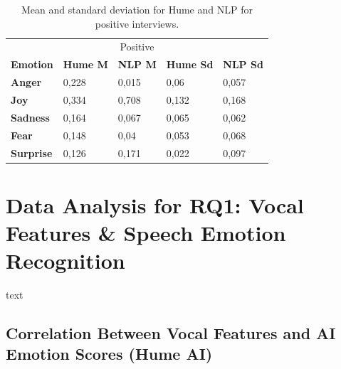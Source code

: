\begin{table}[H]
    \begin{tabular}{lllll}
    \multicolumn{5}{c}{\cellcolor[HTML]{BFBFBF}Positive}                                                                                                                                           \\
    \multicolumn{1}{l|}{\textbf{Emotion}}  & \multicolumn{1}{c}{\textbf{Hume M}} & \multicolumn{1}{c}{\textbf{NLP M}} & \multicolumn{1}{c}{\textbf{Hume Sd}} & \multicolumn{1}{c}{\textbf{NLP Sd}} \\ \hline
    \multicolumn{1}{l|}{\textbf{Anger}}    & 0,228                               & 0,015                              & 0,06                                 & 0,057                               \\
    \multicolumn{1}{l|}{\textbf{Joy}}      & 0,334                               & 0,708                              & 0,132                                & 0,168                               \\
    \multicolumn{1}{l|}{\textbf{Sadness}}  & 0,164                               & 0,067                              & 0,065                                & 0,062                               \\
    \multicolumn{1}{l|}{\textbf{Fear}}     & 0,148                               & 0,04                               & 0,053                                & 0,068                               \\
    \multicolumn{1}{l|}{\textbf{Surprise}} & 0,126                               & 0,171                              & 0,022                                & 0,097                              
    \end{tabular}
    \caption{Mean and standard deviation for Hume and NLP for positive interviews.}
    \label{tab:summery_hume_nlp_pos}
\end{table}

\section{Data Analysis for RQ1: Vocal Features \& Speech Emotion Recognition}
text 
\subsection{Correlation Between Vocal Features and AI Emotion Scores (Hume AI)}

